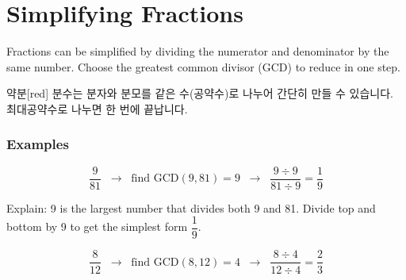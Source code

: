 \documentclass[12pt]{book}
\begin{document}




\twosidedpaper
\section{Simplifying Fractions}

Fractions can be simplified by dividing the numerator and denominator by the same number.  
Choose the greatest common divisor (GCD) to reduce in one step.


\begin{flexbox}{약분}[red]
분수는 분자와 분모를 같은 수(공약수)로 나누어 간단히 만들 수 있습니다.  
최대공약수로 나누면 한 번에 끝납니다.
\end{flexbox}

\subsubsection*{Examples}

\[
\dfrac{9}{81} \;\; \rightarrow \;\; \text{find GCD}(9,81)=9 \;\; \rightarrow \;\; \dfrac{9\div9}{81\div9} = \dfrac{1}{9}
\]

Explain: 9 is the largest number that divides both 9 and 81.  
Divide top and bottom by 9 to get the simplest form \(\dfrac{1}{9}\).



\[
\dfrac{8}{12} \;\; \rightarrow \;\; \text{find GCD}(8,12)=4 \;\; \rightarrow \;\; \dfrac{8\div4}{12\div4} = \dfrac{2}{3}
\]
\end{document}
